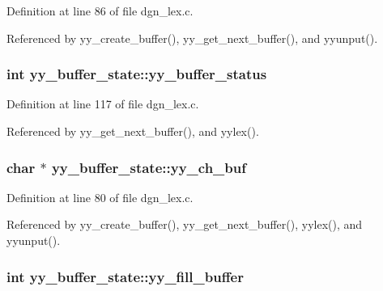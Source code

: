 Definition at line 86 of file dgn\+\_\+lex.\+c.



Referenced by yy\+\_\+create\+\_\+buffer(), yy\+\_\+get\+\_\+next\+\_\+buffer(), and yyunput().

\hypertarget{structyy__buffer__state_a70fd925d37a2f0454fbd0def675d106c}{
\subsubsection[{yy\+\_\+buffer\+\_\+status}]{\setlength{\rightskip}{0pt plus 5cm}int yy\+\_\+buffer\+\_\+state\+::yy\+\_\+buffer\+\_\+status}}\label{structyy__buffer__state_a70fd925d37a2f0454fbd0def675d106c}


Definition at line 117 of file dgn\+\_\+lex.\+c.



Referenced by yy\+\_\+get\+\_\+next\+\_\+buffer(), and yylex().

\hypertarget{structyy__buffer__state_a0d25458e69eb22207fc633a1255d099d}{
\subsubsection[{yy\+\_\+ch\+\_\+buf}]{\setlength{\rightskip}{0pt plus 5cm}char $\ast$ yy\+\_\+buffer\+\_\+state\+::yy\+\_\+ch\+\_\+buf}}\label{structyy__buffer__state_a0d25458e69eb22207fc633a1255d099d}


Definition at line 80 of file dgn\+\_\+lex.\+c.



Referenced by yy\+\_\+create\+\_\+buffer(), yy\+\_\+get\+\_\+next\+\_\+buffer(), yylex(), and yyunput().

\hypertarget{structyy__buffer__state_a63d2afbb1d79a3fc63df9e12626f827d}{
\subsubsection[{yy\+\_\+fill\+\_\+buffer}]{\setlength{\rightskip}{0pt plus 5cm}int yy\+\_\+buffer\+\_\+state\+::yy\+\_\+fill\+\_\+buffer}}\label{structyy__buffer__state_a63d2afbb1d79a3fc63df9e12626f827d}



